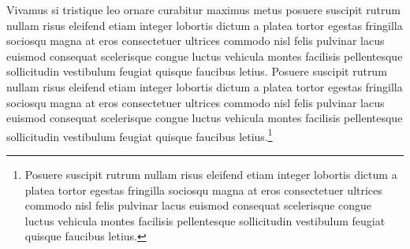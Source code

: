 Vivamus si tristique leo ornare curabitur maximus metus posuere suscipit
rutrum nullam risus eleifend etiam integer lobortis dictum a platea
tortor egestas fringilla sociosqu magna at eros consectetuer ultrices
commodo nisl felis pulvinar lacus euismod consequat scelerisque congue
luctus vehicula montes facilisis pellentesque sollicitudin vestibulum
feugiat quisque faucibus letius. Posuere suscipit rutrum nullam risus
eleifend etiam integer lobortis dictum a platea tortor egestas fringilla
sociosqu magna at eros consectetuer ultrices commodo nisl felis pulvinar
lacus euismod consequat scelerisque congue luctus vehicula montes
facilisis pellentesque sollicitudin vestibulum feugiat quisque faucibus
letius.\footnote{Posuere suscipit rutrum nullam risus eleifend etiam
  integer lobortis dictum a platea tortor egestas fringilla sociosqu
  magna at eros consectetuer ultrices commodo nisl felis pulvinar lacus
  euismod consequat scelerisque congue luctus vehicula montes facilisis
  pellentesque sollicitudin vestibulum feugiat quisque faucibus letius.}
